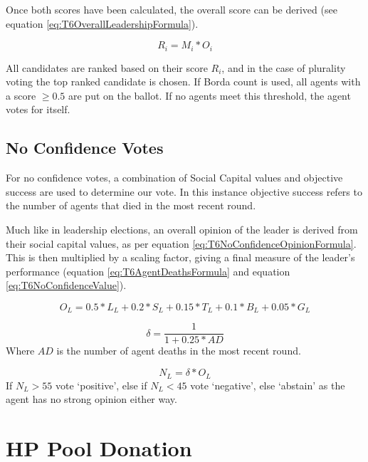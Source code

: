 Once both scores have been calculated, the overall score can be derived (see equation \ref{eq:T6OverallLeadershipFormula}).

\begin{equation}\label{eq:T6OverallLeadershipFormula}
    R_{i} = M_{i} * O_{i}
\end{equation}

All candidates are ranked based on their score $R_{i}$, and in the case of plurality voting the top ranked candidate is chosen. If Borda count is used, all agents with a score $\geq 0.5$ are put on the ballot. If no agents meet this threshold, the agent votes for itself.

\subsection{No Confidence Votes}

For no confidence votes, a combination of Social Capital values and objective success are used to determine our vote. In this instance objective success refers to the number of agents that died in the most recent round.

Much like in leadership elections, an overall opinion of the leader is derived from their social capital values, as per equation \ref{eq:T6NoConfidenceOpinionFormula}. This is then multiplied by a scaling factor, giving a final measure of the leader's performance (equation \ref{eq:T6AgentDeathsFormula} and equation \ref{eq:T6NoConfidenceValue}).

\begin{equation}\label{eq:T6NoConfidenceOpinionFormula}
    O_{L} = 0.5 * L_{L} + 0.2 * S_{L} + 0.15 * T_{L} + 0.1 * B_{L} + 0.05 * G_{L}
\end{equation}

\begin{equation}\label{eq:T6AgentDeathsFormula}
    \delta = \frac{1}{1+0.25*AD}
\end{equation}
Where $AD$ is the number of agent deaths in the most recent round.

\begin{equation}\label{eq:T6NoConfidenceValue}
    N_{L} = \delta * O_{L} 
\end{equation}
If $N_{L} > 55$ vote `positive', else if $N_L < 45$ vote `negative', else `abstain' as the agent has no strong opinion either way.

\section{HP Pool Donation}


